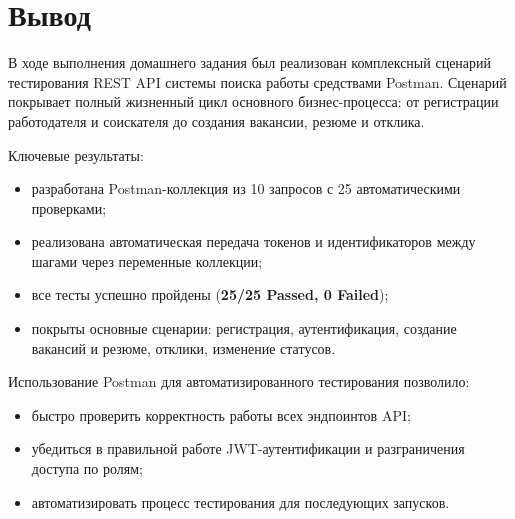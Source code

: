 ﻿\documentclass[a4paper,14pt]{extarticle}
\begin{document}
\section{Вывод}

В ходе выполнения домашнего задания был реализован комплексный сценарий тестирования REST API системы поиска работы средствами Postman. Сценарий покрывает полный жизненный цикл основного бизнес-процесса: от регистрации работодателя и соискателя до создания вакансии, резюме и отклика.

Ключевые результаты:
\begin{itemize}[leftmargin=2cm]
  \item разработана Postman-коллекция из 10 запросов с 25 автоматическими проверками;
  \item реализована автоматическая передача токенов и идентификаторов между шагами через переменные коллекции;
  \item все тесты успешно пройдены (\textbf{25/25 Passed, 0 Failed});
  \item покрыты основные сценарии: регистрация, аутентификация, создание вакансий и резюме, отклики, изменение статусов.
\end{itemize}

Использование Postman для автоматизированного тестирования позволило:
\begin{itemize}[leftmargin=2cm]
  \item быстро проверить корректность работы всех эндпоинтов API;
  \item убедиться в правильной работе JWT-аутентификации и разграничения доступа по ролям;
  \item автоматизировать процесс тестирования для последующих запусков.
\end{itemize}
\end{document}
